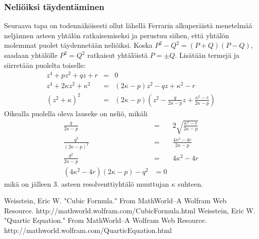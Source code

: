 \documentclass[a4paper]{article}
\begin{document}
\subsubsection{Neliöiksi täydentäminen}
Seuraava tapa on todennäköisesti ollut lähellä Ferrarin alkuperäistä menetelmää neljännen asteen yhtälön ratkaisemiseksi ja perustuu siihen, että yhtälön molemmat puolet täydennetään neliöiksi. Koska $P^2-Q^2=(P+Q)(P-Q)$, saadaan yhtälölle $P^2=Q^2$ ratkaisut yhtälöistä $P=\pm Q$. Lisätään termejä ja siirretään puolelta toiselle:
\begin{eqnarray*}
  z^4+pz^2+qz+r & = & 0 \\
  z^4+2\kappa z^2+\kappa^2 & = & (2\kappa-p) z^2-qz+\kappa^2-r \\
  \left(z^2+\kappa\right)^2 & = & \left(2\kappa-p\right)\left(z^2-\frac{q}{2\kappa -p}z+\frac{\kappa^2-r}{2\kappa -p}\right)
\end{eqnarray*}
Oikealla puolella oleva lauseke on neliö, mikäli
\begin{eqnarray*}
  \frac{q}{2\kappa -p} & = & 2\sqrt{\frac{\kappa^2-r}{2\kappa -p}} \\
  \frac{q^2}{(2\kappa -p)^2} & = & \frac{4\kappa^2-4r}{2\kappa -p} \\
  \frac{q^2}{2\kappa -p} & = & 4\kappa^2-4r \\
  (4\kappa^2-4r)(2\kappa -p)-q^2 & = 0
\end{eqnarray*}
mikä on jälleen 3. asteen resolventtiyhtälö muuttujan $\kappa$ suhteen.
\begin{thebibliography}{99}
 Weisstein, Eric W. "Cubic Formula." From MathWorld--A Wolfram Web Resource. http://mathworld.wolfram.com/CubicFormula.html
 Weisstein, Eric W. "Quartic Equation." From MathWorld--A Wolfram Web Resource. http://mathworld.wolfram.com/QuarticEquation.html
\end{thebibliography}
\end{document}
